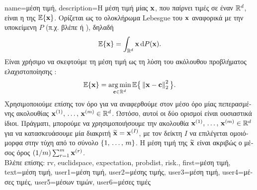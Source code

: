 {name={\foreignlanguage{greek}{μέση τιμή}},
	description={\foreignlanguage{greek}{Η μέση τιμή μίας} 
		 ${\bf x}$, \foreignlanguage{greek}{που παίρνει τιμές σε έναν}  $\mathbb{R}^{d}$, 
		\foreignlanguage{greek}{είναι η}  \foreignlanguage{greek}{της}
 		$\mathbb{E}\{{\bf x}\}$. \foreignlanguage{greek}{Ορίζεται ως το ολοκλήρωμα} Lebesgue \foreignlanguage{greek}{του} ${\bf x}$ 
		\foreignlanguage{greek}{αναφορικά με την υποκείμενη}  $P$ (\foreignlanguage{greek}{π.χ. βλέπε} 
		\cite{RudinBookPrinciplesMatheAnalysis} \foreignlanguage{greek}{ή} \cite{BillingsleyProbMeasure}), \foreignlanguage{greek}{δηλαδή}
		\[
			\mathbb{E}\{{\bf x}\} = \int_{\mathbb{R}^{d}} {\bf x} \, \mathrm{d}P({\bf x}).
		\] 
		\foreignlanguage{greek}{Είναι χρήσιμο να σκεφτούμε τη μέση τιμή ως τη λύση του ακόλουθου προβλήματος 
		ελαχιστοποίησης}  \cite{BertsekasProb}:
		\[
			\mathbb{E}\{{\bf x}\} = \operatorname*{arg\,min}_{{\bf c} \in \mathbb{R}^{d}} 
			\mathbb{E} \big\{\left\Vert {{\bf x}- {\bf c}} \right\Vert_{2}^{2}\big \}.
		\] 
		\foreignlanguage{greek}{Χρησιμοποιούμε επίσης τον όρο για να αναφερθούμε στον μέσο όρο μίας πεπερασμένης ακολουθίας  
		${\bf x}^{(1)}, \,\ldots, \,{\bf x}^{(m)} \in \mathbb{R}^{d}$. Ωστόσο, 
		αυτοί οι δύο ορισμοί είναι ουσιαστικά ίδιοι. Πράγματι, μπορούμε να χρησιμοποιήσουμε την ακολουθία  
		${\bf x}^{(1)}, \,\ldots, \,{\bf x}^{(m)} \in \mathbb{R}^{d}$ για να κατασκευάσουμε μία διακριτή}  $\widetilde{{\bf x}}={\bf x}^{(I)}$, 
		\foreignlanguage{greek}{με τον δείκτη $I$ να επιλέγεται ομοιόμορφα στην τύχη από το σύνολο 
		$\{1, \,\ldots, \,m\}$. Η μέση τιμή της $\widetilde{{\bf x}}$ είναι ακριβώς ο μέσος όρος}
		$({1}/{m}) \sum_{r=1}^{m} {\bf x}^{(r)}$.\\
		\foreignlanguage{greek}{Βλέπε επίσης:} \gls{rv}, \gls{euclidspace}, \gls{expectation}, \gls{probdist}, \gls{risk}.}, 
	first={\foreignlanguage{greek}{μέση τιμή}}, 
	text={\foreignlanguage{greek}{μέση τιμή}},
	user1={\foreignlanguage{greek}{μέση τιμή}}, %
   	user2={\foreignlanguage{greek}{μέσης τιμής}}, %
	user3={\foreignlanguage{greek}{μέση τιμή}}, %
	user4={\foreignlanguage{greek}{μέσες τιμές}}, %
   	user5={\foreignlanguage{greek}{μέσων τιμών}}, %
	user6={\foreignlanguage{greek}{μέσες τιμές}} %
}

